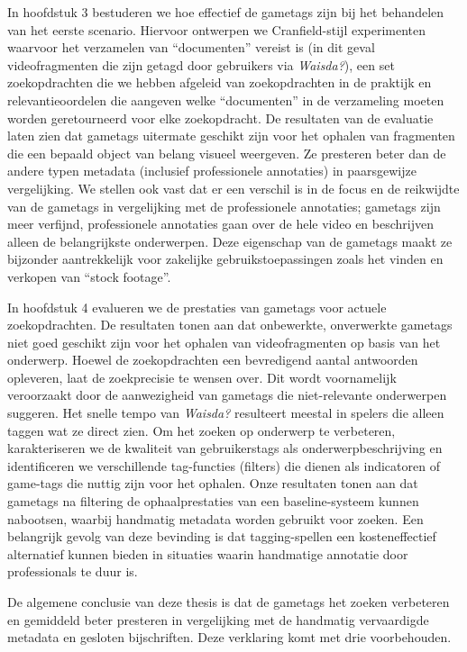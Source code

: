 In hoofdstuk 3 bestuderen we hoe effectief de gametags zijn bij het behandelen van het eerste scenario. Hiervoor ontwerpen we Cranfield-stijl experimenten waarvoor het verzamelen van
``documenten'' vereist is (in dit geval videofragmenten die zijn getagd door gebruikers via \textit{Waisda?}), een set zoekopdrachten die we hebben afgeleid van zoekopdrachten in de praktijk en
relevantieoordelen die aangeven welke ``documenten'' in de verzameling moeten worden geretourneerd voor elke zoekopdracht. De resultaten van de evaluatie laten zien dat gametags
uitermate geschikt zijn voor het ophalen van fragmenten die een bepaald object van belang visueel weergeven. Ze presteren beter dan de andere typen metadata (inclusief professionele annotaties) in
paarsgewijze vergelijking. We stellen ook vast dat er een verschil is in de focus en de reikwijdte van de gametags in vergelijking met de professionele annotaties; gametags zijn meer verfijnd, professionele annotaties gaan over de hele video en beschrijven alleen de belangrijkste onderwerpen. Deze eigenschap van de gametags maakt ze bijzonder aantrekkelijk
voor zakelijke gebruikstoepassingen zoals het vinden en verkopen van ``stock footage''.

In hoofdstuk 4 evalueren we de prestaties van gametags voor actuele zoekopdrachten. De resultaten tonen aan dat onbewerkte, onverwerkte gametags niet goed geschikt zijn voor het ophalen van videofragmenten op basis van het onderwerp. Hoewel de zoekopdrachten een bevredigend aantal antwoorden opleveren, laat de zoekprecisie te wensen over. Dit
wordt voornamelijk veroorzaakt door de aanwezigheid van gametags die niet-relevante onderwerpen suggeren. Het snelle tempo van \textit{Waisda?} resulteert meestal in spelers die alleen taggen wat ze direct zien. Om het zoeken op onderwerp te verbeteren, karakteriseren we de kwaliteit van gebruikerstags als onderwerpbeschrijving en identificeren we verschillende tag-functies (filters) die dienen als indicatoren of game-tags die nuttig zijn voor het ophalen. Onze resultaten tonen aan dat gametags na filtering de ophaalprestaties van een baseline-systeem kunnen nabootsen, waarbij
handmatig metadata worden gebruikt voor zoeken. Een belangrijk gevolg van deze bevinding is dat tagging-spellen een kosteneffectief alternatief kunnen bieden in situaties waarin handmatige
annotatie door professionals te duur is.

De algemene conclusie van deze thesis is dat de gametags het zoeken verbeteren en gemiddeld beter presteren in vergelijking met de handmatig vervaardigde metadata en gesloten bijschriften.
Deze verklaring komt met drie voorbehouden.


